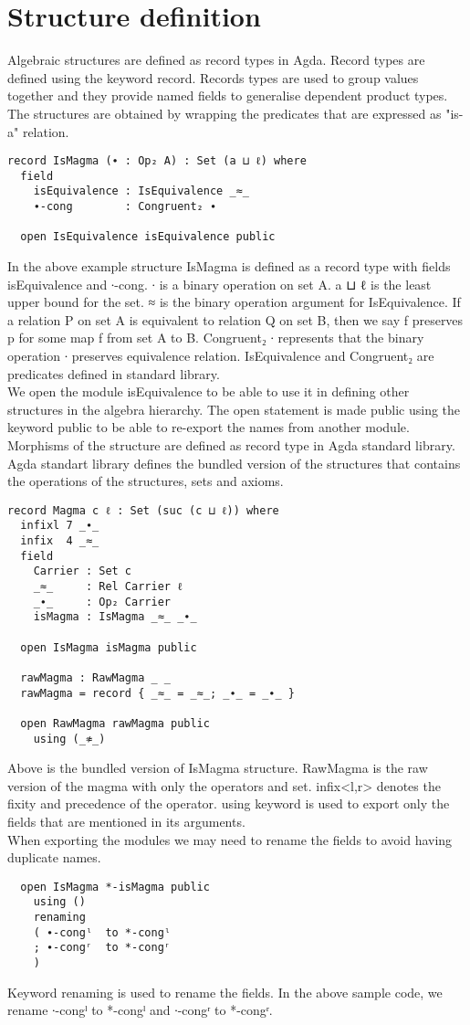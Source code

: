 \section{Structure definition}
Algebraic structures are defined as record types in Agda. Record types are defined using the keyword record. Records types are used to group values together and they provide named fields to generalise dependent product types. The structures are obtained by wrapping the predicates that are expressed as "is-a" relation. ~\citep{hu2021formalizing}
\begin{Verbatim}
record IsMagma (∙ : Op₂ A) : Set (a ⊔ ℓ) where
  field
    isEquivalence : IsEquivalence _≈_
    ∙-cong        : Congruent₂ ∙

  open IsEquivalence isEquivalence public
\end{Verbatim}
In the above example structure IsMagma is defined as a record type with fields isEquivalence and ∙-cong. ∙ is a binary operation on set A. a ⊔ ℓ is the least upper bound for the set. \textunderscore  ≈ \textunderscore is the binary operation argument for IsEquivalence. If a relation P on set A is equivalent to relation Q on set B, then we say f preserves p for some map f from set A to B. Congruent₂ ∙ represents that the binary operation ∙ preserves equivalence relation. IsEquivalence and Congruent₂ are predicates defined in standard library.\\
We open the module isEquivalence to be able to use it in defining other structures in the algebra hierarchy. The open statement is made public using the keyword public to be able to re-export the names from another module.\\
Morphisms of the structure are defined as record type in Agda standard library.\\
Agda standart library defines the bundled version of the structures that contains the operations of the structures, sets and axioms. 
\begin{Verbatim}
record Magma c ℓ : Set (suc (c ⊔ ℓ)) where
  infixl 7 _∙_
  infix  4 _≈_
  field
    Carrier : Set c
    _≈_     : Rel Carrier ℓ
    _∙_     : Op₂ Carrier
    isMagma : IsMagma _≈_ _∙_

  open IsMagma isMagma public

  rawMagma : RawMagma _ _
  rawMagma = record { _≈_ = _≈_; _∙_ = _∙_ }

  open RawMagma rawMagma public
    using (_≉_)
\end{Verbatim}
Above is the bundled version of IsMagma structure. RawMagma is the raw version of the magma with only the operators and set. infix<l,r> denotes the fixity and precedence of the operator. using keyword is used to export only the fields that are mentioned in its arguments. \\
When exporting the modules we may need to rename the fields to avoid having duplicate names.
\begin{Verbatim}
  open IsMagma *-isMagma public
    using ()
    renaming
    ( ∙-congˡ  to *-congˡ
    ; ∙-congʳ  to *-congʳ
    )
\end{Verbatim} 
Keyword renaming is used to rename the fields. In the above sample code, we rename ∙-congˡ  to *-congˡ and ∙-congʳ  to *-congʳ.

